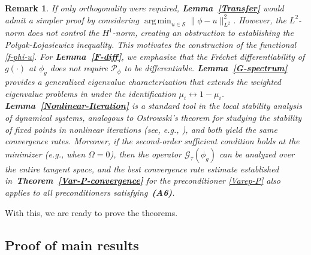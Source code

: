 \documentclass[preprint,3p]{elsarticle}
\newtheorem{remark}{Remark}[section]
\DeclareMathOperator*{\argmin}{arg\,min}
\begin{document}
\begin{remark}
	If only orthogonality were required, \textbf{Lemma~\ref{Transfer}} would admit a simpler proof by considering $\argmin_{u \in \mathcal{S}} \|\phi - u\|_{L^2}^2$. However, the $L^2$-norm does not control the $H^1$-norm, creating an obstruction to establishing the Polyak-\L ojasiewicz inequality. This motivates the construction of the functional \eqref{f-phi-u}.  
	For \textbf{Lemma~\ref{F-diff}}, we emphasize that the Fr\'echet differentiability of $g(\cdot)$ at $\phi_g$ does not require $\mathcal{P}_{\phi}$ to be differentiable. {\textbf{Lemma~\ref{G-spectrum}} provides a generalized eigenvalue characterization that extends the weighted eigenvalue problems in \cite{2023The,2024Convergence} under the identification $\mu_i \leftrightarrow 1 - \mu_i$.}
	\textbf{Lemma~\ref{Nonlinear-Iteration}} is a standard tool in the local stability analysis of dynamical systems, analogous to Ostrowski's theorem for studying the stability of fixed points in nonlinear iterations (see, e.g., \cite{2023The}), and both yield the same convergence rates. Moreover, if the second-order sufficient condition holds at the minimizer (e.g., when $\Omega=0$), then the operator $\mathcal{G}_{\tau}(\phi_g)$ can be analyzed over the entire tangent space, and the best convergence rate estimate established in~\textbf{Theorem~\ref{Var-P-convergence}} for the preconditioner \eqref{Varep-P} also applies to all preconditioners satisfying~\textbf{(A6)}.
\end{remark}

With this, we are ready to prove the theorems.
\subsection{Proof of main results}
\end{document}
